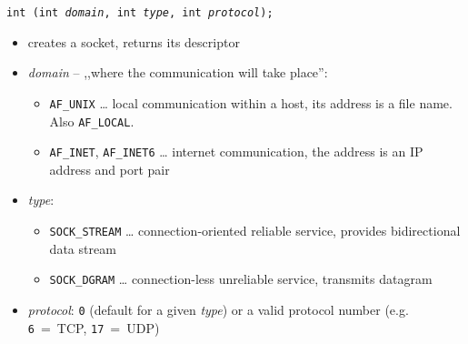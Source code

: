 \begin{slide}
\setlength{\baselineskip}{0.9\baselineskip}
\texttt{int (int \emph{domain}, int \emph{type},
int \emph{protocol});}
\begin{itemize}
\item creates a socket, returns its descriptor
\item \emph{domain} -- ,,where the communication will take place'': 
    \begin{itemize}
    \item \texttt{AF\_UNIX} \dots{} local communication within a host, its
    address is a file name. Also \texttt{AF\_LOCAL}.
    \item \texttt{AF\_INET}, \texttt{AF\_INET6} \dots{} internet communication,
    the address is an IP address and port pair
    \end{itemize}
\item \emph{type}:
    \begin{itemize}
    \item \texttt{SOCK\_STREAM} \dots{} connection-oriented reliable service,
    provides bidirectional data stream
    \item \texttt{SOCK\_DGRAM} \dots{} connection-less unreliable service,
    transmits datagram
    \end{itemize}
\item \emph{protocol}: \texttt{0} (default for a given \emph{type})
or a valid protocol number (e.g. \texttt{6}~=~TCP, \texttt{17}~=~UDP)
\end{itemize}
\end{slide}


